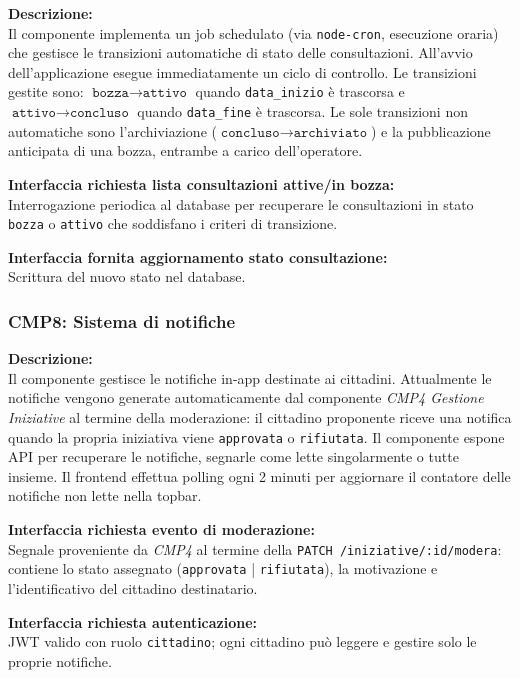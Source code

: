 \documentclass[12pt, a4paper]{article}
\newcommand{\interfacciarichiesta}[1]{\textbf{Interfaccia richiesta #1:}}
\newcommand{\interfacciafornita}[1]{\textbf{Interfaccia fornita #1:}}
\begin{document}
\textbf{Descrizione:}\\
Il componente implementa un job schedulato (via \texttt{node-cron}, esecuzione oraria) che
gestisce le transizioni automatiche di stato delle consultazioni. All'avvio dell'applicazione
esegue immediatamente un ciclo di controllo. Le transizioni gestite sono:
$\texttt{bozza} \to \texttt{attivo}$ quando \texttt{data\_inizio} è trascorsa e
$\texttt{attivo} \to \texttt{concluso}$ quando \texttt{data\_fine} è trascorsa. Le sole transizioni
non automatiche sono l'archiviazione ($\texttt{concluso} \to \texttt{archiviato}$) e la
pubblicazione anticipata di una bozza, entrambe a carico dell'operatore.

\interfacciarichiesta{lista consultazioni attive/in bozza}\\
Interrogazione periodica al database per recuperare le consultazioni in stato \texttt{bozza} o
\texttt{attivo} che soddisfano i criteri di transizione.

\interfacciafornita{aggiornamento stato consultazione}\\
Scrittura del nuovo stato nel database.

\subsubsection*{CMP8: Sistema di notifiche}

\textbf{Descrizione:}\\
Il componente gestisce le notifiche in-app destinate ai cittadini. Attualmente le notifiche vengono
generate automaticamente dal componente \textit{CMP4 Gestione Iniziative} al termine della
moderazione: il cittadino proponente riceve una notifica quando la propria iniziativa viene
\texttt{approvata} o \texttt{rifiutata}. Il componente espone API per recuperare le notifiche,
segnarle come lette singolarmente o tutte insieme. Il frontend effettua polling ogni 2 minuti
per aggiornare il contatore delle notifiche non lette nella topbar.

\interfacciarichiesta{evento di moderazione}\\
Segnale proveniente da \textit{CMP4} al termine della \texttt{PATCH /iniziative/:id/modera}:
contiene lo stato assegnato (\texttt{approvata} | \texttt{rifiutata}), la motivazione e
l'identificativo del cittadino destinatario.

\interfacciarichiesta{autenticazione}\\
JWT valido con ruolo \texttt{cittadino}; ogni cittadino può leggere e gestire solo le proprie
notifiche.
\end{document}
